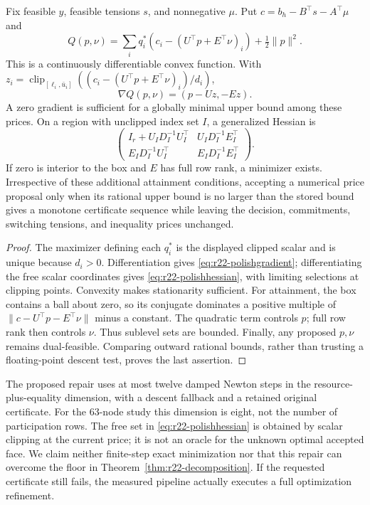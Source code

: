 \begin{proposition}\label{prop:r22-polishing}
Fix feasible $y$, feasible tensions $s$, and nonnegative $\mu$. Put $c=b_h-B^\top s-A^\top\mu$ and
\[
 Q(p,\nu)=\sum_iq_i^*(c_i-(U^\top p+E^\top\nu)_i)+\tfrac12\|p\|^2.
\]
This is a continuously differentiable convex function. With
$z_i=\operatorname{clip}_{[\ell_i,\bar u_i]}((c_i-(U^\top p+E^\top\nu)_i)/d_i)$,
\begin{equation}\label{eq:r22-polishgradient}
 \nabla Q(p,\nu)=(p-Uz,-Ez).
\end{equation}
A zero gradient is sufficient for a globally minimal upper bound among these prices. On a region with unclipped index set $I$, a generalized Hessian is
\begin{equation}\label{eq:r22-polishhessian}
 \begin{pmatrix}
 I_r+U_ID_I^{-1}U_I^\top&U_ID_I^{-1}E_I^\top\\
 E_ID_I^{-1}U_I^\top&E_ID_I^{-1}E_I^\top
 \end{pmatrix}.
\end{equation}
If zero is interior to the box and $E$ has full row rank, a minimizer exists. Irrespective of these additional attainment conditions, accepting a numerical price proposal only when its rational upper bound is no larger than the stored bound gives a monotone certificate sequence while leaving the decision, commitments, switching tensions, and inequality prices unchanged.
\end{proposition}
\begin{proof}
The maximizer defining each $q_i^*$ is the displayed clipped scalar and is unique because $d_i>0$. Differentiation gives \eqref{eq:r22-polishgradient}; differentiating the free scalar coordinates gives \eqref{eq:r22-polishhessian}, with limiting selections at clipping points. Convexity makes stationarity sufficient. For attainment, the box contains a ball about zero, so its conjugate dominates a positive multiple of $\|c-U^\top p-E^\top\nu\|$ minus a constant. The quadratic term controls $p$; full row rank then controls $\nu$. Thus sublevel sets are bounded. Finally, any proposed $p,\nu$ remains dual-feasible. Comparing outward rational bounds, rather than trusting a floating-point descent test, proves the last assertion.
\end{proof}
The proposed repair uses at most twelve damped Newton steps in the resource-plus-equality dimension, with a descent fallback and a retained original certificate. For the 63-node study this dimension is eight, not the number of participation rows. The free set in \eqref{eq:r22-polishhessian} is obtained by scalar clipping at the current price; it is not an oracle for the unknown optimal accepted face. We claim neither finite-step exact minimization nor that this repair can overcome the floor in Theorem~\ref{thm:r22-decomposition}. If the requested certificate still fails, the measured pipeline actually executes a full optimization refinement.

